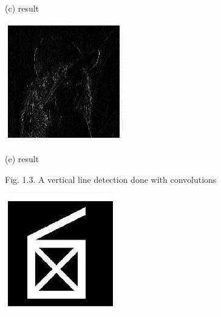 \documentclass[10pt]{article}
\begin{document}
(c) result

\includegraphics[max width=\textwidth]{2022_01_06_b5ce182ed1bd5f482e5bg-10(3)}

(e) result

Fig. 1.3. A vertical line detection done with convolutions

\includegraphics[max width=\textwidth]{2022_01_06_b5ce182ed1bd5f482e5bg-10(4)}
\end{document}
